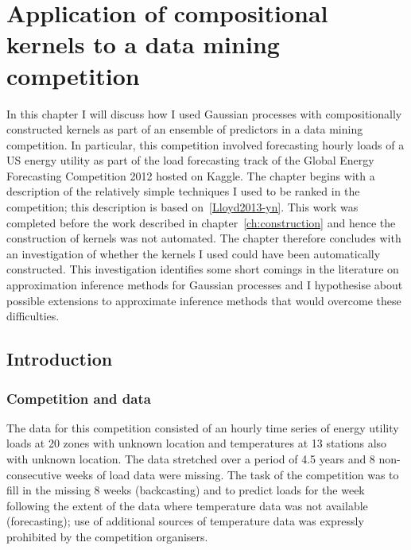 
\inbpdocument

\chapter{Application of compositional kernels to a data mining competition}
\label{ch:gefcom}

In this chapter I will discuss how I used Gaussian processes with compositionally constructed kernels as part of an ensemble of predictors in a data mining competition.
In particular, this competition involved forecasting hourly loads of a US energy utility as part of the load forecasting track of the Global Energy Forecasting Competition 2012 hosted on Kaggle.
The chapter begins with a description of the relatively simple techniques I used to be ranked  in the competition; this description is based on~\ref{Lloyd2013-yn}.
This work was completed before the work described in chapter~\ref{ch:construction} and hence the construction of kernels was not automated.
The chapter therefore concludes with an investigation of whether the kernels I used could have been automatically constructed.
This investigation identifies some short comings in the literature on approximation inference methods for Gaussian processes and I hypothesise about possible extensions to approximate inference methods that would overcome these difficulties.

\section{Introduction}

\subsection{Competition and data}

The data for this competition consisted of an hourly time series of energy utility loads at 20 zones with unknown location and temperatures at 13 stations also with unknown location.
The data stretched over a period of 4.5 years and 8 non-consecutive weeks of load data were missing.
The task of the competition was to fill in the missing 8 weeks (backcasting) and to predict loads for the week following the extent of the data where temperature data was not available (forecasting); use of additional sources of temperature data was expressly prohibited by the competition organisers.

